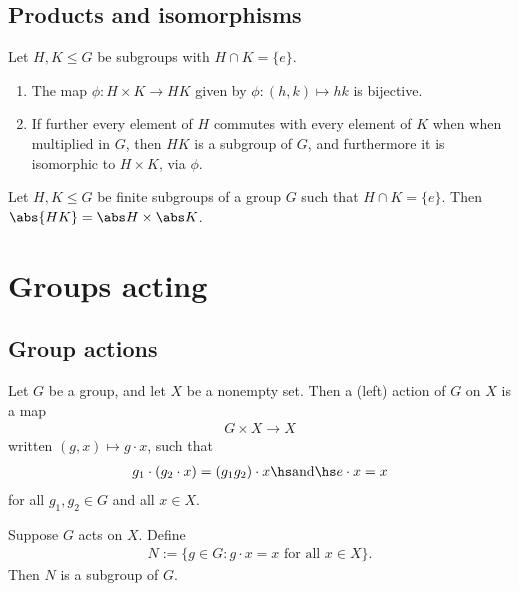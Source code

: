 \documentclass{article}
\begin{document}
\subsection{Products and isomorphisms}

\begin{theorem}
    Let $H,K\leq G$ be subgroups with $H\cap K=\{e\}$.
    \begin{enumerate}
        \item The map $\phi:H\times K\to HK$ given by $\phi:(h,k)\mapsto hk$ is bijective.
        \item If further every element of $H$ commutes with every element of $K$ when
              when multiplied in $G$, then $HK$ is a subgroup of $G$, and
              furthermore it is isomorphic to $H\times K$, via $\phi$.
    \end{enumerate}
\end{theorem}

\begin{corollary}
    Let $H,K\leq G$ be finite subgroups of a group $G$ such that
    $H\cap K=\{e\}$. Then $\abs{HK} = \abs H \times \abs K$.
\end{corollary}


\section{Groups acting}


\subsection{Group actions}

\begin{definition}
    Let $G$ be a group, and let $X$ be a nonempty set. Then a (left)
    action of $G$ on $X$ is a map
    \begin{align*}
        G\times X \to X
    \end{align*}
    written $(g,x)\mapsto g\cdot x$, such that
    \begin{align*}
        g_1\cdot(g_2\cdot x) = (g_1g_2)\cdot x\hs\text{and}\hs e\cdot x = x
    \end{align*}
    for all $g_1,g_2\in G$ and all $x\in X$.
\end{definition}

\setcounter{theorem}{2}
\begin{proposition}
    Suppose $G$ acts on $X$. Define
    \begin{align*}
        N:=\{g\in G : g\cdot x = x \text{ for all } x\in X\}.
    \end{align*}
    Then $N$ is a subgroup of $G$.
\end{proposition}
\end{document}
